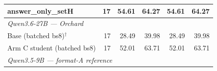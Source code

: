 \begin{table}[t]
{\begin{tabular}{lrrrrr}
answer\_only\_setH & 17 & 54.61 & 64.27 & 54.61 & 64.27 \\
\midrule
\multicolumn{6}{l}{\textit{Qwen3.6-27B --- Orchard}} \\
Base (batched bs8)$^{\dagger}$ & 17 & 28.49 & 39.98 & 28.49 & 39.98 \\
Arm C student (batched bs8) & 17 & 52.01 & 63.71 & 52.01 & 63.71 \\
\midrule
\multicolumn{6}{l}{\textit{Qwen3.5-9B --- format-A reference}} \\

\end{tabular}}
\end{table}
